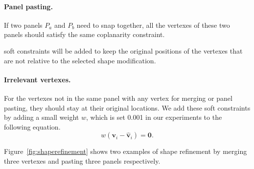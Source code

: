 {\paragraph{Panel pasting.}
If two panels $P_a$ and $P_b$ need to snap together, all the vertexes of these two panels should satisfy the same coplanarity constraint. 



 soft constraints will be added to keep the original positions of the vertexes that are not relative to the selected shape modification.

\paragraph{Irrelevant vertexes.} For the vertexes not in the same panel with any vertex for merging or panel pasting, they should stay at their original locations. 
We add these soft constraints by adding a small weight $w$, which is set 0.001 in our experiments to the following equation. 
\begin{equation}
w(\mathbf{v}_i - \mathbf{\hat{v}}_i) = \mathbf{0}.
\label{equ:irrelevant}
\end{equation}

Figure~\ref{fig:shaperefinement} shows two examples of shape refinement by merging three vertexes and pasting three panels respectively. 

}
